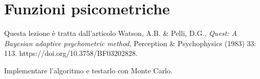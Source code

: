 
\section{Funzioni psicometriche}

Questa lezione è tratta dall'articolo
Watson, A.B. \& Pelli, D.G., \emph{Quest: A Bayesian adaptive psychometric method}, Perception \& Psychophysics (1983) 33: 113. https://doi.org/10.3758/BF03202828.

\begin{exercise}
	Implementare l'algoritmo e testarlo con Monte Carlo.
\end{exercise}
